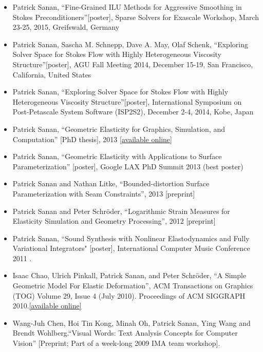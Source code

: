 \documentclass[12pt]{article}
\begin{document}
\begin{itemize}
\item Patrick Sanan, ``Fine-Grained ILU Methods for Aggressive Smoothing in Stokes Preconditioners''[poster], Sparse Solvers for Exascale Workshop, March 23-25, 2015, Greifswald, Germany
\item Patrick Sanan, Sascha M. Schnepp, Dave A. May, Olaf Schenk, ``Exploring Solver Space for Stokes Flow with Highly Heterogeneous Viscosity Structure''[poster], AGU Fall Meeting 2014, December 15-19, San Francisco, California, United States
\item Patrick Sanan, ``Exploring Solver Space for Stokes Flow with Highly Heterogeneous Viscosity Structure''[poster], International Symposium on Post-Petascale System Software (ISP2S2), December 2-4, 2014, Kobe, Japan
\item Patrick Sanan, ``Geometric Elasticity for Graphics, Simulation, and Computation'' [PhD thesis], 2013 \href{http://resolver.caltech.edu/CaltechTHESIS:12052013-121547860}{[available online]}
\item Patrick Sanan, ``Geometric Elasticity with Applications to Surface Parameterization'' [poster], Google LAX PhD Summit 2013 (best poster)
\item Patrick Sanan and Nathan Litke, ``Bounded-distortion Surface Parameterization with Seam Constraints'', 2013 [preprint]
\item Patrick Sanan and Peter Schr\"{o}der, ``Logarithmic Strain Measures for Elasticity Simulation and Geometry Processing'', 2012 [preprint]
\item Patrick Sanan, ``Sound Synthesis with Nonlinear Elastodynamics and Fully Variational Integrators" [poster], International Computer Music Conference 2011 .
\item Isaac Chao, Ulrich Pinkall, Patrick Sanan, and Peter Schr\"{o}der, ``A Simple Geometric Model For Elastic Deformation'', ACM Transactions on Graphics (TOG) Volume 29, Issue 4 (July 2010). Proceedings of ACM SIGGRAPH 2010.{\href{http://multires.caltech.edu/pubs/GeomElastic.pdf}{[available online]}}
\item Wang-Juh Chen, Hoi Tin Kong, Minah Oh, Patrick Sanan, Ying Wang and Brendt Wohlberg.``Visual Words: Text Analysis Concepts for Computer Vision'' [Preprint; Part of a week-long 2009 IMA team workshop]. 
\end{itemize}
\end{document}
